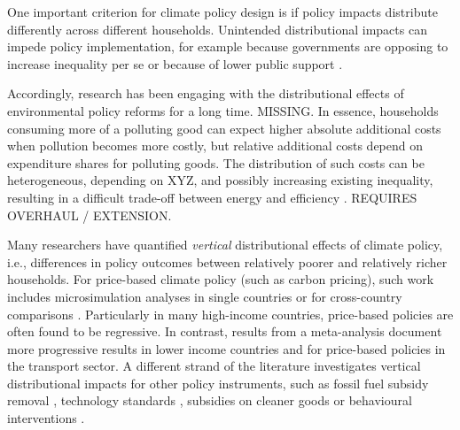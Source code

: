 \documentclass[12pt, a4paper]{article}
\begin{document}
One important criterion for climate policy design is if policy impacts distribute differently across different households. Unintended distributional impacts can impede policy implementation, for example because governments are opposing to increase inequality per se or because of lower public support \autocite{Bergquist.2022,Douenne.2022}. 

Accordingly, research has been engaging with the distributional effects of environmental policy reforms for a long time. MISSING. In essence, households consuming more of a polluting good can expect higher absolute additional costs when pollution becomes more costly, but relative additional costs depend on expenditure shares for polluting goods. The distribution of such costs can be heterogeneous, depending on XYZ, and possibly increasing existing inequality, resulting in a difficult trade-off between energy and efficiency \autocite{Hansel.2022}. REQUIRES OVERHAUL / EXTENSION.

Many researchers have quantified \textit{vertical} distributional effects of climate policy, i.e., differences in policy outcomes between relatively poorer and relatively richer households. For price-based climate policy (such as carbon pricing), such work includes microsimulation analyses in single countries \autocite{Goulder.2019,Grainger.2010,Rausch.2011,Garaffa.2021,Sterner.2012,Wu.2022} or for cross-country comparisons \autocite{Budolfson.2021,Feindt.2021,Dorband.2019,Steckel.2021b,VogtSchilb.2019,Missbach.2024}. Particularly in many high-income countries, price-based policies are often found to be regressive. In contrast, results from a meta-analysis \autocite{Ohlendorf.2021} document more progressive results in lower income countries and for price-based policies in the transport sector.
A different strand of the literature investigates vertical distributional impacts for other policy instruments, such as fossil fuel subsidy removal \autocite{Schaffitzel.2019,Giuliano.2020}, technology standards \autocite{Levinson.2019,Zhao.2022,Bruegge.2019}, subsidies on cleaner goods \autocite{Borenstein.2016,Vaishnav.2017} or behavioural interventions \autocite{DellaValle.2020,Liebe.2021}. %
\end{document}
